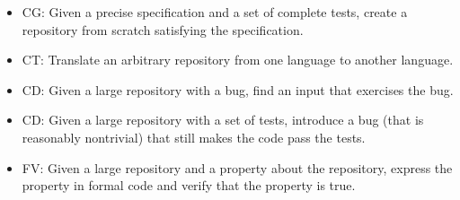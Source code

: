 \begin{itemize}
    \item CG: Given a precise specification and a set of complete tests, create a repository from scratch satisfying the specification. 
    \item CT: Translate an arbitrary repository from one language to another language.
    \item CD: Given a large repository with a bug, find an input that exercises the bug.
    \item CD: Given a large repository with a set of tests, introduce a bug (that is reasonably nontrivial) that still makes the code pass the tests.
    \item FV: Given a large repository and a property about the repository, express the property in formal code and verify that the property is true.
\end{itemize}